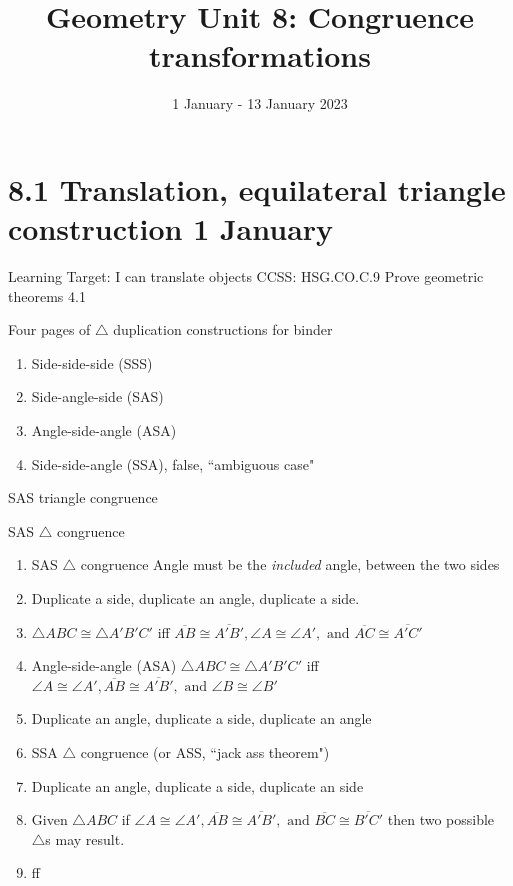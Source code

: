 \documentclass[onlytextwidth]{beamer}
\title{Geometry Unit 8: Congruence transformations}
\date{1 January - 13 January 2023}
\begin{document}
\frame{\titlepage}

\section[Outline]{}
\frame{\tableofcontents}


\section{8.1 Translation, equilateral triangle construction \hfill 1 January}
\begin{frame}{Learning Target: I can translate objects}
{CCSS: HSG.CO.C.9 Prove geometric theorems \hfill \alert{4.1}}
  \begin{block}{Four pages of $\triangle$ duplication constructions for binder}
    \begin{enumerate}
        \item Side-side-side (SSS)
        \item Side-angle-side (SAS)
        \item Angle-side-angle (ASA)
        \item Side-side-angle (SSA), false, ``ambiguous case"
    \end{enumerate}
  \end{block}
\end{frame}

\begin{frame}{SAS triangle congruence}
  \begin{block}{SAS $\triangle$ congruence}
    \begin{enumerate}
        \item SAS $\triangle$ congruence Angle must be the \emph{included} angle, between the two sides
        \item Duplicate a side, duplicate an angle, duplicate a side.
        \item $\triangle ABC \cong \triangle A'B'C'$ iff $\overline{AB} \cong \overline{A'B'}, \angle A \cong \angle A', \text{ and } \overline{AC} \cong \overline{A'C'}$
        \item Angle-side-angle (ASA) $\triangle ABC \cong \triangle A'B'C'$ iff $\angle A \cong \angle A', \overline{AB} \cong \overline{A'B'}, \text{ and } \angle B \cong \angle B'$
        \item Duplicate an angle, duplicate a side, duplicate an angle
         \item SSA $\triangle$ congruence (or ASS, ``jack ass theorem")
        \item Duplicate an angle, duplicate a side, duplicate an side
        \item Given $\triangle ABC$ if $ \angle A \cong \angle A', \overline{AB} \cong \overline{A'B'}, \text{ and } \overline{BC} \cong \overline{B'C'}$ then two possible $\triangle$s may result.
         \item  ff
      \end{enumerate}
    \end{block}
\end{frame}
\end{document}
